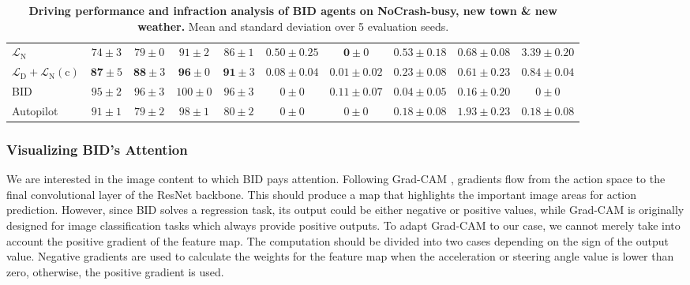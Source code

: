 \begin{table}
\begin{tabular}{lccccccccc}
		$\mathcal{L}_\text{N}$
		& $74\pm3$ & $79\pm0$ & $91\pm2$ & $86\pm1$ 
		& $0.50\pm0.25$ & $\mathbf{0}\pm0$ & $0.53\pm0.18$ & $0.68\pm0.08$ & $3.39\pm0.20$ \\
		$\mathcal{L}_\text{D}+\mathcal{L}_\text{N}(\text{c})$
		& $\mathbf{87} \pm 5$ & $\mathbf{88} \pm 3$ & $\mathbf{96} \pm 0$ & $\mathbf{91} \pm 3$ 
		& $\mathbf{0.08} \pm 0.04$ & $0.01 \pm 0.02$ & $\mathbf{0.23} \pm 0.08$ & $\mathbf{0.61} \pm 0.23$ & $\mathbf{0.84} \pm 0.04$ \\
		\cmidrule(lr){1-1}\cmidrule(lr){2-5}\cmidrule(lr){6-10}
		BID
		& $95 \pm 2$ & $96 \pm 3$ & $100 \pm 0$ & $96 \pm 3$ 
		& $0 \pm 0$ & $0.11 \pm 0.07$ & $0.04 \pm 0.05$ & $0.16 \pm 0.20$ & $0 \pm 0$ \\
		Autopilot
		& $91 \pm 1$ & $79 \pm 2$ & $98 \pm 1$ & $80 \pm 2$ 
		& $0 \pm 0$ & $0 \pm 0$ & $0.18 \pm 0.08$ & $1.93 \pm 0.23$ & $0.18 \pm 0.08$\\
		\bottomrule
	\end{tabular}
	\vspace{-1ex}
	\caption{\textbf{Driving performance and infraction analysis of BID agents on NoCrash-busy, new town \& new weather.} 
		Mean and standard deviation over 5 evaluation seeds.}
	\vspace{-2.5ex}
	\label{table:infraction}
\end{table}


\subsubsection{Visualizing BID's Attention}
\label{sec:Visualization}
\hspace{1pc}We are interested in the image content to which BID pays attention. 
Following Grad-CAM \cite{Selvaraju:2017}, gradients flow from the action space to the final convolutional layer of the ResNet backbone. 
This should produce a map that highlights the important image areas for action prediction. 
However, since BID solves a regression task, its output could be either negative or positive values, while Grad-CAM is originally designed for image classification tasks which always provide positive outputs. 
To adapt Grad-CAM to our case, we cannot merely take into account the positive gradient of the feature map. 
The computation should be divided into two cases depending on the sign of the output value. 
Negative gradients are used to calculate the weights for the feature map when the acceleration or steering angle value is lower than zero, otherwise, the positive gradient is used.


